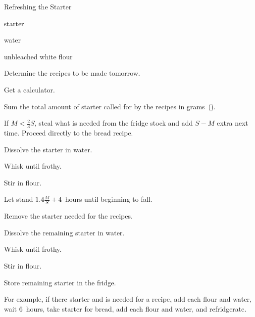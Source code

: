 \begin{recipe}{Refreshing the Starter}{}{}

\begin{ingredients}
\item {} starter
\item water
\item unbleached white flour
\end{ingredients}

\begin{directions}
\item Determine the recipes to be made tomorrow.
\item Get a calculator.
\item Sum the total amount of starter called for by the recipes in grams~().
\item If $M < \frac{2}{3}S$, steal what is needed from the fridge stock and add $S-M$ extra next time. Proceed directly to the bread recipe.
\item Dissolve the starter in  water.
\item Whisk until frothy.
\item Stir in  flour.
\item Let stand $1.4\frac{M}{S} + 4$~hours until beginning to fall.
\item Remove the starter needed for the recipes.
\item Dissolve the remaining starter in  water.
\item Whisk until frothy.
\item Stir in  flour.
\item Store remaining starter in the fridge.
\end{directions}

For example, if there  starter and  is needed for a recipe, add  each flour and water, wait 6~hours, take  starter for bread, add  each flour and water, and refridgerate.

\end{recipe}
